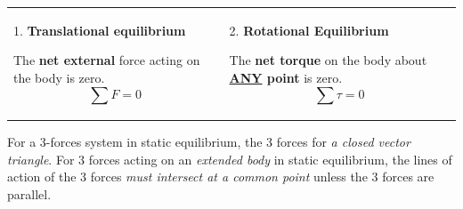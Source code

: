 \documentclass[a4paper,11pt]{article}
\begin{document}
			\begin{tabular}{@{} C{0.48\textwidth} C{0.48\textwidth}  @{}}
				1. \textbf{Translational equilibrium} \par The \textbf{net external} force acting on the body is zero. $$\sum F = 0$$ & 2. \textbf{Rotational Equilibrium} \par The \textbf{net torque} on the body about \textbf{\underline{ANY} point} is zero. $$\sum \tau = 0$$ \vspace*{-\baselineskip} \\
			\end{tabular}
			
			For a 3-forces system in static equilibrium, the 3 forces for \textit{a closed vector triangle}. For 3 forces acting on an \textit{extended body} in static equilibrium, the lines of action of the 3 forces \textit{must intersect at a common point} unless the 3 forces are parallel.
\end{document}

